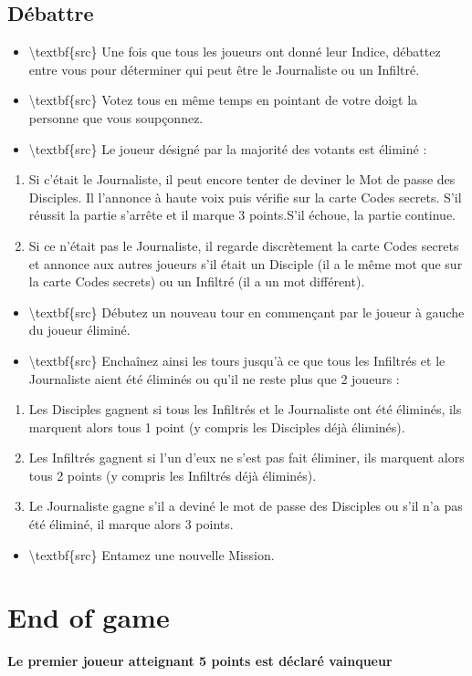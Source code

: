 \documentclass{article}%
\begin{document}
%
\subsection{ Débattre
}%
\label{subsec:Dbattre}%
\begin{itemize}%
\item%
\textbackslash{}textbf\{src\}%
 Une fois que tous les joueurs ont donné leur Indice, débattez entre vous pour déterminer qui peut être le Journaliste ou un Infiltré.
%
\item%
\textbackslash{}textbf\{src\}%
 Votez tous en même temps en pointant de votre doigt la personne que vous soupçonnez.
%
\item%
\textbackslash{}textbf\{src\}%
 Le joueur désigné par la majorité des votants est éliminé :
%
\end{itemize}%
\begin{enumerate}%
\item%
 Si c’était le Journaliste, il peut encore tenter de deviner le Mot de passe des Disciples. Il l'annonce à haute voix puis vérifie sur la carte Codes secrets. S’il réussit la partie s’arrête et il marque 3 points.S’il échoue, la partie continue.
%
\item%
 Si ce n’était pas le Journaliste, il regarde discrètement la carte Codes secrets et annonce aux autres joueurs s’il était un Disciple (il a le même mot que sur la carte Codes secrets) ou un Infiltré (il a un mot différent).
%
\end{enumerate}%
\begin{itemize}%
\item%
\textbackslash{}textbf\{src\}%
 Débutez un nouveau tour en commençant par le joueur à gauche du joueur éliminé.
%
\item%
\textbackslash{}textbf\{src\}%
 Enchaînez ainsi les tours jusqu’à ce que tous les Infiltrés et le Journaliste aient été éliminés ou qu’il ne reste plus que 2 joueurs :
%
\end{itemize}%
\begin{enumerate}%
\item%
 Les Disciples gagnent si tous les Infiltrés et le Journaliste ont été éliminés, ils marquent alors tous 1 point (y compris les Disciples déjà éliminés).
%
\item%
 Les Infiltrés gagnent si l'un d'eux ne s'est pas fait éliminer, ils marquent alors tous 2 points (y compris les Infiltrés déjà éliminés).
%
\item%
 Le Journaliste gagne s'il a deviné le mot de passe des Disciples ou s'il n'a pas été éliminé, il marque alors 3 points.
%
\end{enumerate}%
\begin{itemize}%
\item%
\textbackslash{}textbf\{src\}%
 Entamez une nouvelle Mission.
%
\end{itemize}

%
\section{ End of game
}%
\label{sec:Endofgame}%
\textbf{Le premier joueur atteignant 5 points est déclaré vainqueur}

%
\end{document}
